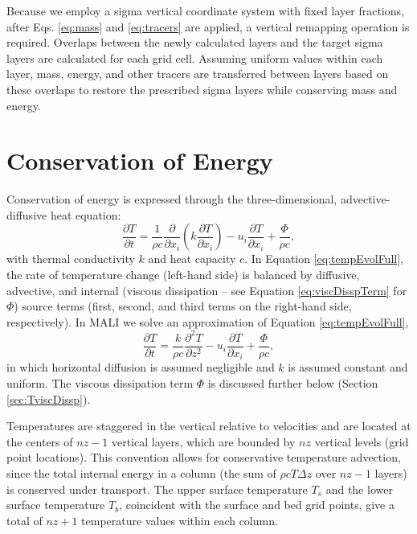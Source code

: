 Because we employ a sigma vertical coordinate system with fixed layer fractions,
after Eqs. \ref{eq:mass} and \ref{eq:tracers} are applied, a vertical remapping operation is required.
Overlaps between the newly calculated layers and the target sigma layers are calculated for each grid cell.
Assuming uniform values within each layer, mass, energy, and other tracers are transferred between layers
based on these overlaps to restore the prescribed sigma layers while conserving mass and energy.

\section{Conservation of Energy}
\label{sec:consEnergy}

Conservation of energy is expressed through the three-dimensional, advective-diffusive heat equation: 
\begin{equation}
   \label{eq:tempEvolFull}
  \frac{\partial T}{\partial t} = 
  {\frac{1}{\rho c}}{\frac{\partial }{\partial x_{ i}}}\left(k{\frac{\partial T}{\partial x_{ i}}}\right) - {u_{ i}}{\frac{\partial T}{\partial x_{ i}}} + \frac{\Phi}{\rho c},
\end{equation}
with thermal conductivity $k$ and heat capacity $c$. In Equation \ref{eq:tempEvolFull}, the rate of temperature change (left-hand side) is balanced by diffusive, advective, and internal (viscous dissipation -- see Equation \ref{eq:viscDisspTerm} for $\Phi$) source terms (first, second, and third terms on the right-hand side, respectively). 
In MALI we solve an approximation of Equation \ref{eq:tempEvolFull}, 
\begin{equation}
  \label{eq:tempEvolApprox}
  \frac{\partial T}{\partial t} = 
  {\frac{k}{\rho c}}{\frac{\partial^{2} T}{\partial z^{2}}} - {u_{ i}}{\frac{\partial T}{\partial x_{ i}}} + \frac{\Phi}{\rho c}, %
\end{equation}
in which horizontal diffusion is assumed negligible \citep[][p. 280]{vdv2013} and $k$ is assumed constant and uniform. The viscous dissipation term $\Phi$ is discussed further below (Section \ref{sec:TviscDissp}).

Temperatures are staggered in the vertical relative to velocities and are located at the centers of $nz-1$ vertical layers, which are bounded by $nz$ vertical levels (grid point locations). This convention allows for conservative temperature advection, since the total internal energy in a column (the sum of $\rho c T \Delta z$ over $nz-1$ layers) is conserved under transport. The upper surface temperature $T_s$ and the lower surface temperature $T_b$, coincident with the surface and bed grid points, give a total of $nz+1$ temperature values within each column.

